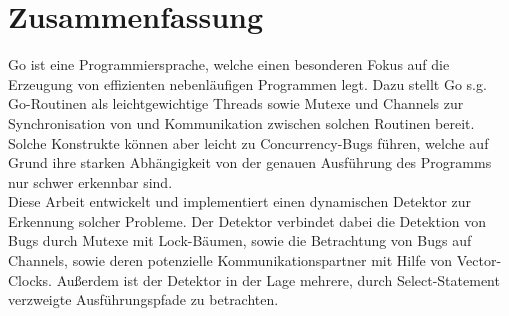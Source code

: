 \chapter*{Zusammenfassung}
Go ist eine Programmiersprache, welche einen besonderen Fokus auf 
die Erzeugung von effizienten nebenläufigen Programmen legt. Dazu 
stellt Go s.g. Go-Routinen als leichtgewichtige Threads sowie 
Mutexe und Channels zur Synchronisation von und Kommunikation zwischen 
solchen Routinen bereit. Solche Konstrukte können aber leicht zu 
Concurrency-Bugs führen, welche auf Grund ihre starken Abhängigkeit von der 
genauen Ausführung des Programms nur schwer erkennbar sind.\\
Diese Arbeit entwickelt und implementiert einen dynamischen Detektor zur
Erkennung solcher Probleme. Der Detektor verbindet dabei die Detektion 
von Bugs durch Mutexe mit Lock-Bäumen, sowie die Betrachtung von 
Bugs auf Channels, sowie deren potenzielle Kommunikationspartner mit Hilfe von 
Vector-Clocks. Außerdem ist der Detektor in der 
Lage mehrere, durch Select-Statement verzweigte Ausführungspfade zu betrachten.